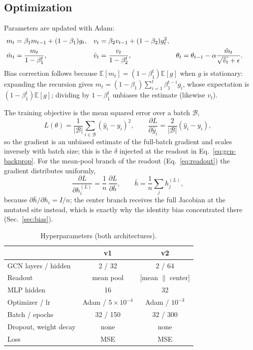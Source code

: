 \documentclass[11pt]{article}
\begin{document}
\subsection{Optimization}
Parameters are updated with Adam:
\begin{align}
m_t &= \beta_1 m_{t-1} + (1-\beta_1) g_t, &
v_t &= \beta_2 v_{t-1} + (1-\beta_2) g_t^2, \notag\\
\hat m_t &= \frac{m_t}{1-\beta_1^t}, &
\hat v_t &= \frac{v_t}{1-\beta_2^t}, &
\theta_t &= \theta_{t-1} - \alpha \frac{\hat m_t}{\sqrt{\hat v_t}+\epsilon}.
\label{eq:adam}
\end{align}
Bias correction follows because
$\mathbb{E}[m_t]=(1-\beta_1^t)\mathbb{E}[g]$ when $g$ is stationary:
expanding the recursion gives $m_t=(1-\beta_1)\sum_{i=1}^{t}\beta_1^{t-i}g_i$,
whose expectation is $(1-\beta_1^t)\mathbb{E}[g]$; dividing by
$1-\beta_1^t$ unbiases the estimate (likewise $v_t$).

The training objective is the mean squared error over a batch $\mathcal{B}$,
\begin{equation}
L(\theta) = \frac{1}{|\mathcal{B}|}\sum_{i\in\mathcal{B}} (\hat y_i - y_i)^2,
\qquad
\frac{\partial L}{\partial \hat y_i} = \frac{2}{|\mathcal{B}|}(\hat y_i - y_i),
\label{eq:loss}
\end{equation}
so the gradient is an unbiased estimate of the full-batch gradient and
scales inversely with batch size; this is the $\delta$ injected at the
readout in Eq.~\eqref{eq:gcn-backprop}. For the mean-pool branch of the
readout (Eq.~\eqref{eq:readout}) the gradient distributes uniformly,
\begin{equation}
\frac{\partial L}{\partial h_i^{(L)}} =
\frac{1}{n}\,\frac{\partial L}{\partial \bar h},
\qquad
\bar h = \frac{1}{n}\sum_j h_j^{(L)},
\label{eq:poolgrad}
\end{equation}
because $\partial \bar h/\partial h_i = I/n$; the center branch receives
the full Jacobian at the mutated site instead, which is exactly why the
identity bias concentrated there (Sec.~\ref{sec:bias}).

\begin{table}[ht]
\centering
\caption{Hyperparameters (both architectures).}
\label{tab:hp}
\begin{tabular}{l c c}
\hline
 & v1 & v2 \\ \hline
GCN layers / hidden & 2 / 32 & 2 / 64 \\
Readout & mean pool & [mean $\|$ center] \\
MLP hidden & 16 & 32 \\
Optimizer / lr & Adam / $5\times10^{-4}$ & Adam / $10^{-3}$ \\
Batch / epochs & 32 / 150 & 32 / 300 \\
Dropout, weight decay & none & none \\
Loss & MSE & MSE \\
\hline
\end{tabular}
\end{table}
\end{document}
